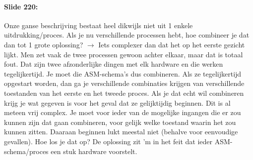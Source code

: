 \documentclass[10pt,a4paper]{book}
\begin{document}
\paragraph{Slide 220:} Onze ganse beschrijving bestaat heel dikwijls niet uit 1 enkele uitdrukking/proces. Als je nu verschillende processen hebt, hoe combineer je dat dan tot 1 grote oplossing? $\rightarrow$ Iets complexer dan dat het op het eerste gezicht lijkt. Men zet vaak de twee processen gewoon achter elkaar, maar dat is totaal fout. Dat zijn twee afzonderlijke dingen met elk hardware en die werken tegelijkertijd. Je moet die ASM-schema's dus combineren. Als ze tegelijkertijd opgestart worden, dan ga je verschillende combinaties krijgen van verschillende toestanden van het eerste en het tweede proces. Als je dat echt wil combineren krijg je wat gegeven is voor het geval dat ze gelijktijdig beginnen. Dit is al meteen vrij complex. Je moet voor ieder van de mogelijke ingangen die er zou kunnen zijn dat gaan combineren, voor gelijk welke toestand waarin het zou kunnen zitten. Daaraan beginnen lukt meestal niet (behalve voor eenvoudige gevallen). Hoe los je dat op? De oplossing zit 'm in het feit dat ieder ASM-schema/proces een stuk hardware voorstelt.
\end{document}
